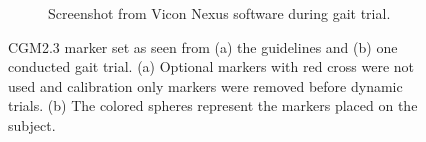 \documentclass[../main.tex]{subfiles}
\begin{document}
\begin{figure}[!ht]
\begin{subfigure}[t]{0.58\textwidth}
         \label{fig:cgm23-markerset-guidelines}
     \end{subfigure}
     \hfill
     \begin{subfigure}[t]{0.40\textwidth}
         \centering
         \caption{Screenshot from Vicon Nexus software during gait trial.}
         \label{fig:cgm23-markerset-experiment-capture}
     \end{subfigure}
    \caption{CGM2.3 marker set as seen from (a) the guidelines and (b) one conducted gait trial. (a) Optional markers with red cross were not used and calibration only markers were removed before dynamic trials. (b) The colored spheres represent the markers placed on the subject.}
    \label{fig:cgm23-markerset}
\end{figure}
\end{document}
